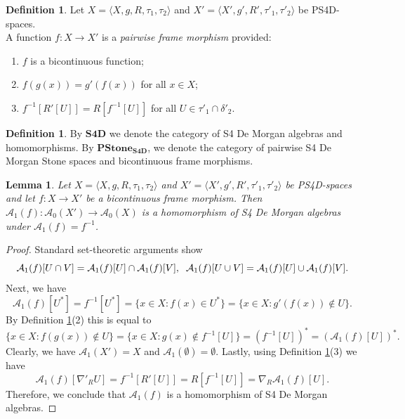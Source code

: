 \documentclass{amsart}
\theoremstyle{plain}
\newtheorem{lemma}[theorem]{Lemma}
\theoremstyle{definition}
\newtheorem{definition}[theorem]{Definition}
\begin{document}
\begin{definition}\label{parwise frame homomorphism}
    Let $X= \langle X, g, R, \tau_1, \tau_2 \rangle$ and $X' = \langle X', g', R', \tau'_1, \tau'_2 \rangle$ be PS4D-spaces. \\ A function $f\colon X\to X'$ is a \emph{pairwise frame morphism} provided:
    \begin{enumerate}
        \item $f$ is a bicontinuous function; 
        \item $f(g(x))=g'(f(x))$ for all $x\in X$; 
        \item $f^{-1}[R'[U]]=R[f^{-1}[U]]$ for all $U\in\tau'_1\cap\delta'_2$. 
    \end{enumerate}
\end{definition}
\begin{definition}
    By $\mathbf{S4D}$ we denote the category of S4 De Morgan algebras and homomorphisms. By $\mathbf{PStone_{S4D}}$, we denote the category of pairwise S4 De Morgan Stone spaces and bicontinuous frame morphisms.  
\end{definition}
\begin{lemma}\label{cont to homo}
    Let $X= \langle X, g, R, \tau_1, \tau_2 \rangle$ and $X' = \langle X', g', R', \tau'_1, \tau'_2 \rangle$ be PS4D-spaces and let $f\colon X\to X'$ be a bicontinuous frame morphism. Then $\mathcal{A}_1(f)\colon\mathcal{A}_0(X')\to\mathcal{A}_0(X)$ is a homomorphism of S4 De Morgan algebras under $\mathcal{A}_1(f)=f^{-1}$.  
\end{lemma}

\begin{proof}
Standard set-theoretic arguments show  \[\mathcal{A}_1(f)[U \cap V]=\mathcal{A}_1(f)[U] \cap \mathcal{A}_1(f)[V],\hspace{.2cm}\mathcal{A}_1(f)[U \cup V]=\mathcal{A}_1(f)[U] \cup \mathcal{A}_1(f)[V].\] Next, we have 
$$\mathcal{A}_1(f)[U^*]=f^{-1}[U^*]=\{x \in X : f(x) \in U^*\}=\{x \in X : g'(f(x)) \notin U\}.$$
By Definition \ref{parwise frame homomorphism}(2) this is equal to
$$\{x \in X : f(g(x)) \notin U\}=\{x \in X : g(x) \notin f^{-1}[U]\}=(f^{-1}[U])^*=(\mathcal{A}_1(f)[U])^*.$$
Clearly, we have $\mathcal{A}_1(X')=X$ and $\mathcal{A}_1(\emptyset)=\emptyset$. Lastly, using Definition \ref{parwise frame homomorphism}(3) we have 
$$\mathcal{A}_1(f)[\nabla'_R U]=f^{-1}[R'[U]]=R[f^{-1}[U]]=\nabla_R \mathcal{A}_1(f)[U].$$  Therefore, we conclude that $\mathcal{A}_1(f)$ is a homomorphism of S4 De Morgan algebras. 
\end{proof}
\end{document}
